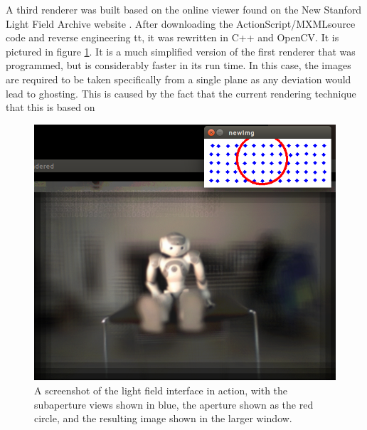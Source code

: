 \documentclass[12pt]{report}
\begin{document}
A third renderer was built based on the online viewer found on the New Stanford Light Field Archive website \cite{lfArchive}. After downloading the ActionScript/MXMLsource code and reverse engineering tt, it was rewritten in C++ and OpenCV. It is pictured in figure \ref{fig:light_field_system}. It is a much simplified version of the first renderer that was programmed, but is considerably faster in its run time. In this case, the images are required to be taken specifically from a single plane as any deviation would lead to ghosting. This is caused by the fact that the current rendering technique that this is based on 
\begin{figure}[!ht]
	\centering
	\includegraphics[scale=0.4]{nau_lf.png}
	\caption{A screenshot of the light field interface in action, with the subaperture views shown in blue, the aperture shown as the red circle, and the resulting image shown in the larger window.}
	\label{fig:light_field_system}
\end{figure}
\end{document}
